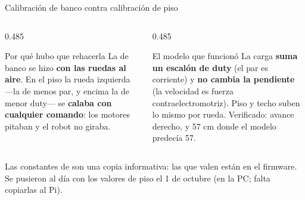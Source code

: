 \begin{frame}{Calibración de banco contra calibración de piso}

  \vspace{0.5em}
  \begin{columns}[T,onlytextwidth]
    \begin{column}{0.485\textwidth}
      \begin{alertblock}{Por qué hubo que rehacerla}
        {\footnotesize La de banco se hizo \textbf{con las ruedas al aire}. En el piso
        la rueda izquierda ---la de menos par, y encima la de menor duty--- se
        \textbf{calaba con cualquier comando}: los motores pitaban y el robot
        no giraba.}
      \end{alertblock}
    \end{column}
    \begin{column}{0.485\textwidth}
      \begin{block}{El modelo que funcionó}
        {\footnotesize La carga \textbf{suma un escalón de duty} (el par es
        corriente) y \textbf{no cambia la pendiente} (la velocidad es fuerza
        contraelectromotriz). Piso y techo suben lo mismo por rueda. Verificado:
        avance derecho, y 57 cm donde el modelo predecía 57.}
      \end{block}
    \end{column}
  \end{columns}

  \vspace{0.2em}
  {\footnotesize Las constantes  de  son una
  copia informativa: las que valen están en el firmware. Se pusieron al día
  con los valores de piso el 1 de octubre (en la PC; falta copiarlas al Pi).}
\end{frame}

